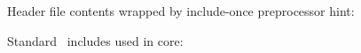 \label{headers}

Header file contents wrapped by include-once preprocessor hint:


Standard \cpp\ includes used in core: 

